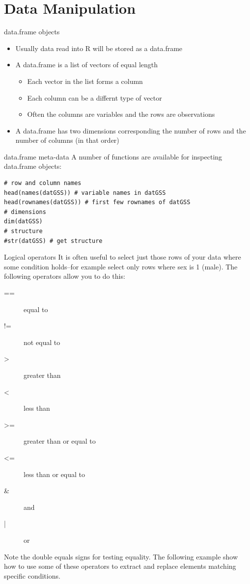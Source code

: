 \documentclass[table,smaller]{beamer}
\begin{document}
\section{Data Manipulation}
\label{sec-6}

\begin{frame}[label=sec-6-1]{data.frame objects}
\begin{itemize}
\item Usually data read into R will be stored as a \alert{data.frame}

\item A data.frame is a list of vectors of equal length
\begin{itemize}
\item Each vector in the list forms a column
\item Each column can be a differnt type of vector
\item Often the columns are variables and the rows are observations
\end{itemize}

\item A data.frame has two dimensions corresponding the number of rows and the number of columns (in that order)
\end{itemize}
\end{frame}

\begin{frame}[fragile,label=sec-6-2]{data.frame meta-data}
 A number of functions are available for inspecting data.frame objects:

\begin{verbatim}
# row and column names
head(names(datGSS)) # variable names in datGSS
head(rownames(datGSS)) # first few rownames of datGSS
# dimensions
dim(datGSS)
# structure
#str(datGSS) # get structure
\end{verbatim}
\end{frame}


\begin{frame}[label=sec-6-3]{Logical operators}
It is often useful to select just those rows of your data where some condition holds--for example select only rows where sex is 1 (male). The following operators allow you to do this:

\begin{description}
\item[{==}] equal to
\item[{!=}] not equal to
\item[{>}] greater than
\item[{<}] less than
\item[{>=}] greater than or equal to
\item[{<=}] less than or equal to
\item[{\&}] and
\item[{|}] or
\end{description}

Note the double equals signs for testing equality. The following example show how to use some of these operators to extract and replace elements matching specific conditions.
\end{frame}
\end{document}
